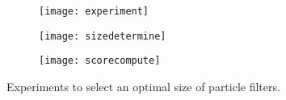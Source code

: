 \begin{figure}[h]
\centering
  \begin{subfigure}{0.48\textwidth}
  \texttt{[image: experiment]}
  \caption{}
  \label{fig:experiment}
  \end{subfigure}
  \begin{subfigure}{0.48\textwidth}
  \texttt{[image: sizedetermine]}
  \caption{}
  \label{fig:sizedeter}
  \end{subfigure}
  \begin{subfigure}{0.48\textwidth}
  \texttt{[image: scorecompute]}
  \caption{}
  \label{fig:scorecompute}
  \end{subfigure}
  \caption{Experiments to select an optimal size of particle filters.}
\end{figure} 


\FloatBarrier